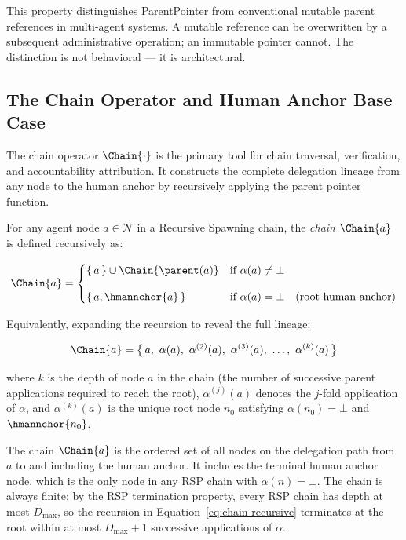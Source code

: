 \documentclass[12pt]{article}
\begin{document}
This property distinguishes ParentPointer from conventional mutable parent references in multi-agent systems. A mutable reference can be overwritten by a subsequent administrative operation; an immutable pointer cannot. The distinction is not behavioral — it is architectural.

\subsection{The Chain Operator and Human Anchor Base Case}
\label{sec:chain-operator-definition}

The chain operator $\Chain{\cdot}$ is the primary tool for chain traversal, verification, and accountability attribution. It constructs the complete delegation lineage from any node to the human anchor by recursively applying the parent pointer function.

\begin{dfn}
\label{def:chain-operator}
For any agent node $a \in \mathcal{N}$ in a Recursive Spawning chain, the \emph{chain} $\Chain{a}$ is defined recursively as:

\begin{equation}
\Chain{a} =
\begin{cases}
\{\,a\,\} \cup \Chain{\parent(a)} & \text{if } \alpha(a) \neq \bot \\[10pt]
\{\,a,\hmannchor{a}\,\} & \text{if } \alpha(a) = \bot \quad \text{(root human anchor)}
\end{cases}
\label{eq:chain-recursive}
\end{equation}

Equivalently, expanding the recursion to reveal the full lineage:

\begin{equation}
\Chain{a} = \bigl\{\, a,\ \alpha(a),\ \alpha^{(2)}(a),\ \alpha^{(3)}(a),\ \ldots,\ \alpha^{(k)}(a) \,\bigr\}
\label{eq:chain-expanded}
\end{equation}

where $k$ is the depth of node $a$ in the chain (the number of successive parent applications required to reach the root), $\alpha^{(j)}(a)$ denotes the $j$-fold application of $\alpha$, and $\alpha^{(k)}(a)$ is the unique root node $n_0$ satisfying $\alpha(n_0) = \bot$ and $\hmannchor{n_0}$.
\end{dfn}

The chain $\Chain{a}$ is the ordered set of all nodes on the delegation path from $a$ to and including the human anchor. It includes the terminal human anchor node, which is the only node in any RSP chain with $\alpha(n) = \bot$. The chain is always finite: by the RSP termination property, every RSP chain has depth at most $D_{\max}$, so the recursion in Equation~\ref{eq:chain-recursive} terminates at the root within at most $D_{\max} + 1$ successive applications of $\alpha$.
\end{document}
